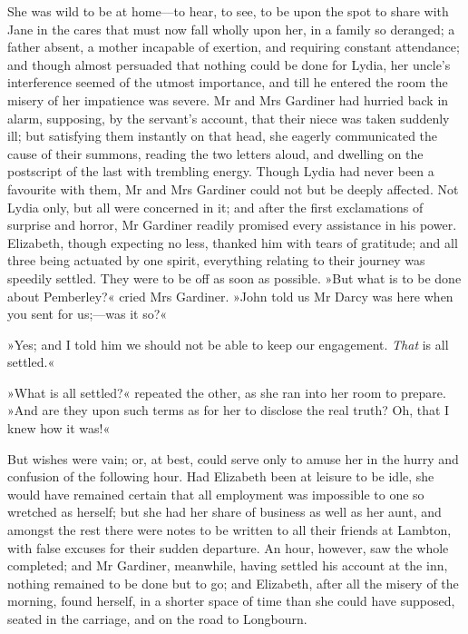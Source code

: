 She was wild to be at home—to hear, to see, to be upon the spot to share with Jane in the cares that must now fall wholly upon her, in a family so deranged; a father absent, a mother incapable of exertion, and requiring constant attendance; and though almost persuaded that nothing could be done for Lydia, her uncle's interference seemed of the utmost importance, and till he entered the room the misery of her impatience was severe. Mr and Mrs Gardiner had hurried back in alarm, supposing, by the servant's account, that their niece was taken suddenly ill; but satisfying them instantly on that head, she eagerly communicated the cause of their summons, reading the two letters aloud, and dwelling on the postscript of the last with trembling energy. Though Lydia had never been a favourite with them, Mr and Mrs Gardiner could not but be deeply affected. Not Lydia only, but all were concerned in it; and after the first exclamations of surprise and horror, Mr Gardiner readily promised every assistance in his power. Elizabeth, though expecting no less, thanked him with tears of gratitude; and all three being actuated by one spirit, everything relating to their journey was speedily settled. They were to be off as soon as possible. »But what is to be done about Pemberley?« cried Mrs Gardiner. »John told us Mr Darcy was here when you sent for us;—was it so?«

»Yes; and I told him we should not be able to keep our engagement. \textit{That} is all settled.«

»What is all settled?« repeated the other, as she ran into her room to prepare. »And are they upon such terms as for her to disclose the real truth? Oh, that I knew how it was!«

But wishes were vain; or, at best, could serve only to amuse her in the hurry and confusion of the following hour. Had Elizabeth been at leisure to be idle, she would have remained certain that all employment was impossible to one so wretched as herself; but she had her share of business as well as her aunt, and amongst the rest there were notes to be written to all their friends at Lambton, with false excuses for their sudden departure. An hour, however, saw the whole completed; and Mr Gardiner, meanwhile, having settled his account at the inn, nothing remained to be done but to go; and Elizabeth, after all the misery of the morning, found herself, in a shorter space of time than she could have supposed, seated in the carriage, and on the road to Longbourn.